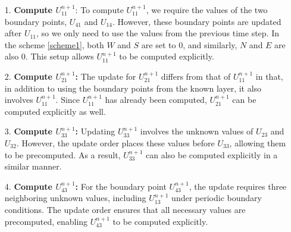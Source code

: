 \documentclass[fleqn,11pt]{elsarticle}
\numberwithin{equation}{section}
\begin{document}
\begin{itemize}
	\item[1.] {\bf Compute $U_{11}^{n+1}$}:  
   To compute $U_{11}^{n+1}$, we require the values of the two boundary points, $U_{41}$ and $U_{14}$. However, these boundary points are updated after $U_{11}$, so we only need to use the values from the previous time step. In the scheme \eqref{scheme1}, both $W$ and $S$ are set to 0, and similarly, $N$ and $E$ are also 0. This setup allows $U_{11}^{n+1}$ to be computed explicitly.

	\item[2.] {\bf  Compute $U_{21}^{n+1}$:} 
   The update for $U_{21}^{n+1}$ differs from that of $U_{11}^{n+1}$ in that, in addition to using the boundary points from the known layer, it also involves $U_{11}^{n+1}$. Since $U_{11}^{n+1}$ has already been computed, $U_{21}^{n+1}$ can be computed explicitly as well.

	\item[3.] {\bf  Compute $U_{33}^{n+1}$:} 
   Updating $U_{33}^{n+1}$ involves the unknown values of $U_{23}$ and $U_{32}$. However, the update order places these values before $U_{33}$, allowing them to be precomputed. As a result, $U_{33}^{n+1}$ can also be computed explicitly in a similar manner.

	\item[4.] {\bf  Compute $U_{43}^{n+1}$:} 
   For the boundary point $U_{43}^{n+1}$, the update requires three neighboring unknown values, including $U_{13}^{n+1}$ under periodic boundary conditions. The update order ensures that all necessary values are precomputed, enabling $U_{43}^{n+1}$ to be computed explicitly.


\end{itemize}
\end{document}
